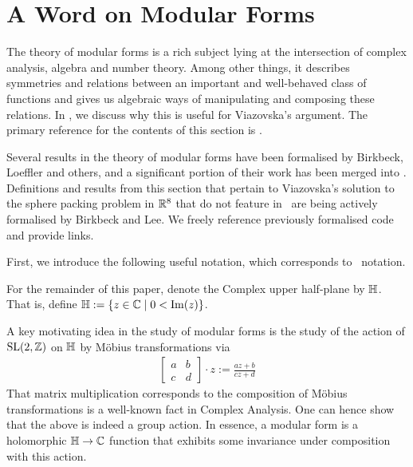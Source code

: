 \section{A Word on Modular Forms}
\label{Ch2:Sec:ModForms}

\begin{comment}
Things to discuss:
1. What is a modular form
2. What is a quasimodular form
3. Examples: Eisenstein Series, Jacobi Theta functions, Discriminant form
We can reference things like the q-expansions of the Eisenstein series, the transformation rules for the Jacobi theta functions, and the product formula for the discriminant form.
\end{comment}

The theory of modular forms is a rich subject lying at the intersection of complex analysis, algebra and number theory. Among other things, it describes symmetries and relations between an important and well-behaved class of functions and gives us algebraic ways of manipulating and composing these relations. In , we discuss why this is useful for Viazovska's argument. The primary reference for the contents of this section is \cite[Chapter 1]{DiamondShurman}.

Several results in the theory of modular forms have been formalised by Birkbeck, Loeffler and others, and a significant portion of their work has been merged into \mathlib. Definitions and results from this section that pertain to Viazovska's solution to the sphere packing problem in $\mathbb{R}^8$ that do not feature in \mathlib\ are being actively formalised by Birkbeck and Lee. We freely reference previously formalised code and provide links.

First, we introduce the following useful notation, which corresponds to \mathlib\ notation.

\begin{boxnotation}
    For the remainder of this paper, denote the Complex upper half-plane by $\mathbb{H}$. That is, define $\mathbb{H} := \left\{ z \in \mathbb{C} \; \middle\vert \; 0 < \operatorname{Im}(z) \right\}$.
\end{boxnotation}

A key motivating idea in the study of modular forms is the study of the action of $\operatorname{SL}\!\left( 2, \mathbb{Z} \right)$ on $\mathbb{H}$ by Möbius transformations via
\begin{align*}
    \begin{bmatrix}
        a & b \\ c & d
    \end{bmatrix}
    \cdot z := \frac{az + b}{cz + d}
\end{align*}
That matrix multiplication corresponds to the composition of Möbius transformations is a well-known fact in Complex Analysis. One can hence show that the above is indeed a group action. In essence, a modular form is a holomorphic $\mathbb{H} \to \mathbb{C}$ function that exhibits some invariance under composition with this action.

